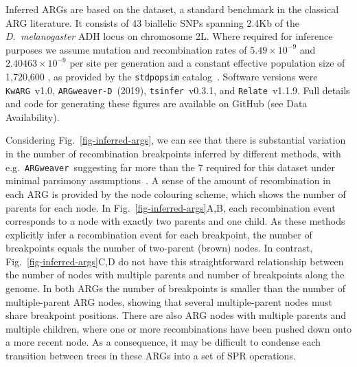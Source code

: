 \documentclass{article}
\newcommand{\tsinfer}[0]{\texttt{tsinfer}}
\newcommand{\kwarg}[0]{\texttt{KwARG}}
\newcommand{\argweaver}[0]{\texttt{ARGweaver}}
\newcommand{\argweaverD}[0]{\texttt{ARGweaver-D}}
\newcommand{\relate}[0]{\texttt{Relate}}
\begin{document}
Inferred ARGs are based on the \citet{kreitman1983nucleotide} dataset,
a standard benchmark in the classical ARG
literature.
It consists of 43 biallelic SNPs spanning 2.4Kb of the \emph{D.~melanogaster} ADH
locus on chromosome 2L. Where required for inference purposes we assume
mutation and recombination rates of $5.49\times10^{-9}$
and $2.40463\times10^{-9}$ per site per generation
\citep{schrider2013rates,comeron2012many}
and a constant effective population size of 1,720,600 \citep{li2006inferring},
as provided by the \texttt{stdpopsim}
catalog~\citep{adrion2020community,lauterbur2023expanding}.
Software versions were \kwarg~v1.0, \argweaverD~(2019),
\tsinfer~v0.3.1, and \relate~v1.1.9.
Full details and code for generating
these figures are available on GitHub (see Data Availability).

Considering Fig.~\ref{fig-inferred-args}, we can see that
there is substantial variation in the number of recombination breakpoints
inferred by different methods, with e.g.~\argweaver\ suggesting
far more than the 7 required for this dataset under minimal parsimony
assumptions~\citep{song2003parsimonious}.
A sense of the amount of recombination in each ARG is provided by
the node colouring scheme, which shows the number of parents for each node.
In Fig.~\ref{fig-inferred-args}A,B, each recombination event
corresponds to a node with exactly two parents and one child.
As these methods explicitly infer a recombination event for each
breakpoint, the number of breakpoints equals the number of two-parent
(brown) nodes.
In contrast, Fig.~\ref{fig-inferred-args}C,D do not have this
straightforward
relationship between the number of nodes with multiple parents
and number of breakpoints along the genome.
In both ARGs the number of breakpoints is smaller
than the number of multiple-parent ARG nodes, showing
that several multiple-parent nodes must share breakpoint positions.
There are also ARG nodes with multiple parents and multiple children,
where one or more recombinations have been pushed down onto a
more recent node.
As a consequence, it may be difficult to condense each transition between trees
in these ARGs into a set of SPR operations.
\end{document}
